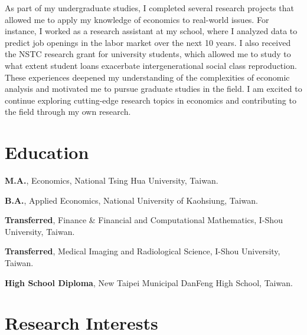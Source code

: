 \documentclass[utf8, 12pt]{article} %
\begin{document}
As part of my undergraduate studies, I completed several research projects that allowed me to apply my knowledge of economics to real-world issues. For instance, I worked as a research assistant at my school, where I analyzed data to predict job openings in the labor market over the next 10 years. I also received the NSTC research grant for university students, which allowed me to study to what extent student loans exacerbate intergenerational social class reproduction. These experiences deepened my understanding of the complexities of economic analysis and motivated me to pursue graduate studies in the field. I am excited to continue exploring cutting-edge research topics in economics and contributing to the field through my own research.


\section{Education}

{{\bf M.A.}, Economics, National Tsing Hua University, Taiwan.}

{{\bf B.A.}, Applied Economics, National University of Kaohsiung, Taiwan.}

{{\bf Transferred}, Finance \& Financial and Computational Mathematics, I-Shou University, Taiwan.}

{{\bf Transferred}, Medical Imaging and Radiological Science, I-Shou University, Taiwan.}

{{\bf High School Diploma}, New Taipei Municipal DanFeng High School, Taiwan.}


\section{Research Interests}

\end{document}
